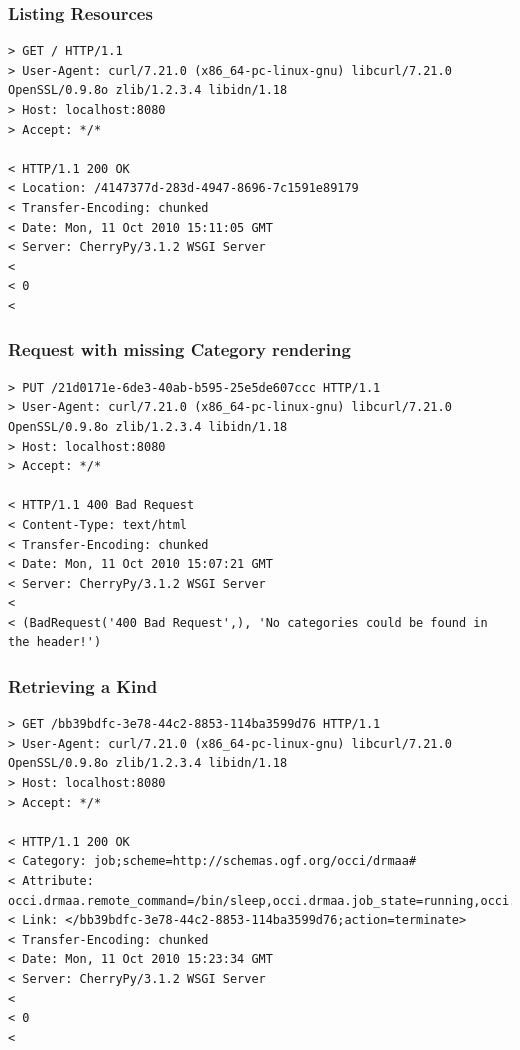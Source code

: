 \documentclass[10pt,a4paper]{article}
\begin{document}
\subsubsection{Listing Resources}

\begin{verbatim}
> GET / HTTP/1.1
> User-Agent: curl/7.21.0 (x86_64-pc-linux-gnu) libcurl/7.21.0 OpenSSL/0.9.8o zlib/1.2.3.4 libidn/1.18
> Host: localhost:8080
> Accept: */*

< HTTP/1.1 200 OK
< Location: /4147377d-283d-4947-8696-7c1591e89179
< Transfer-Encoding: chunked
< Date: Mon, 11 Oct 2010 15:11:05 GMT
< Server: CherryPy/3.1.2 WSGI Server
<
< 0
<
\end{verbatim}

\subsubsection{Request with missing Category rendering}

\begin{verbatim}
> PUT /21d0171e-6de3-40ab-b595-25e5de607ccc HTTP/1.1
> User-Agent: curl/7.21.0 (x86_64-pc-linux-gnu) libcurl/7.21.0 OpenSSL/0.9.8o zlib/1.2.3.4 libidn/1.18
> Host: localhost:8080
> Accept: */*

< HTTP/1.1 400 Bad Request
< Content-Type: text/html
< Transfer-Encoding: chunked
< Date: Mon, 11 Oct 2010 15:07:21 GMT
< Server: CherryPy/3.1.2 WSGI Server
< 
< (BadRequest('400 Bad Request',), 'No categories could be found in the header!')
\end{verbatim}

\subsubsection{Retrieving a Kind}

\begin{verbatim}
> GET /bb39bdfc-3e78-44c2-8853-114ba3599d76 HTTP/1.1
> User-Agent: curl/7.21.0 (x86_64-pc-linux-gnu) libcurl/7.21.0 OpenSSL/0.9.8o zlib/1.2.3.4 libidn/1.18
> Host: localhost:8080
> Accept: */*

< HTTP/1.1 200 OK
< Category: job;scheme=http://schemas.ogf.org/occi/drmaa#
< Attribute: occi.drmaa.remote_command=/bin/sleep,occi.drmaa.job_state=running,occi.drmaa.args=100,occi.drmaa.job_id=4657
< Link: </bb39bdfc-3e78-44c2-8853-114ba3599d76;action=terminate>
< Transfer-Encoding: chunked
< Date: Mon, 11 Oct 2010 15:23:34 GMT
< Server: CherryPy/3.1.2 WSGI Server
< 
< 0
<
\end{verbatim}
\end{document}
